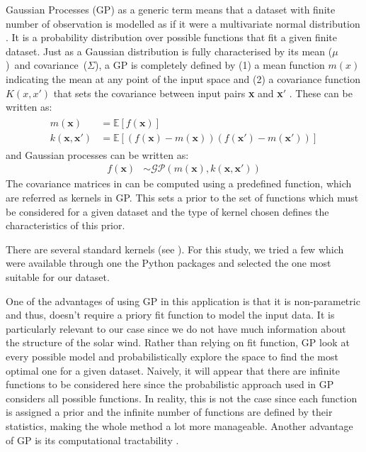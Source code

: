             Gaussian Processes (GP) as a generic term means that a dataset with finite number of
            observation is modelled as if it were a multivariate normal distribution
            \citep{Gramacy2020}. It is a probability distribution over possible functions that fit a
            given finite dataset. Just as a Gaussian distribution is fully characterised by its mean
            ($\mu$)~and covariance~($\Sigma$), a GP is completely defined by (1) a mean function
            $m(x)$ indicating the mean at any point of the input space and (2) a covariance function
            $K(x,x')$ that sets the covariance between input pairs \textbf{x} and \textbf{x}$'$
            \citep{Rasmussen2006}. These can be written as:
            \begin{align}
                \begin{split}
                    m(\mathbf{x}) & = \mathbb{E}[f(\mathbf{x})] \\
                    k(\mathbf{x},\mathbf{x}') & = \mathbb{E}[(f(\mathbf{x})- m(\mathbf{x}))(f(\mathbf{x}')- m(\mathbf{x}'))] \label{eq:gpr_mx_kx}
                \end{split}
            \end{align}
            and Gaussian processes can be written as:
            \begin{align}
                 f(\mathbf{x}) & \sim \mathcal{GP}\left(m(\mathbf{x}), k(\mathbf{x}, \mathbf{x}')\right) \label{eq:gpr_gp}
            \end{align}
            The covariance matrices in  can be computed using a predefined
            function, which are referred as kernels in GP. This sets a prior to the set of functions
            which must be considered for a given dataset and the type of kernel chosen defines the
            characteristics of this prior.

            There are several standard kernels (see ). For this study, we tried a
            few which were available through one the Python packages and selected the one most
            suitable for our dataset.

            One of the advantages of using GP in this application is that it is non-parametric and
            thus, doesn't require a priory fit function to model the input data. It is particularly
            relevant to our case since we do not have much information about the structure of the
            solar wind. Rather than relying on fit function, GP look at every possible model and
            probabilistically explore the space to find the most optimal one for a given dataset.
            Naively, it will appear that there are infinite functions to be considered here since
            the probabilistic approach used in GP considers all possible functions. In reality, this
            is not the case since each function is assigned a prior and the infinite number of
            functions are defined by their statistics, making the whole method a lot more
            manageable. Another advantage of GP is its computational tractability
            \citep{Rasmussen2006}.
            
